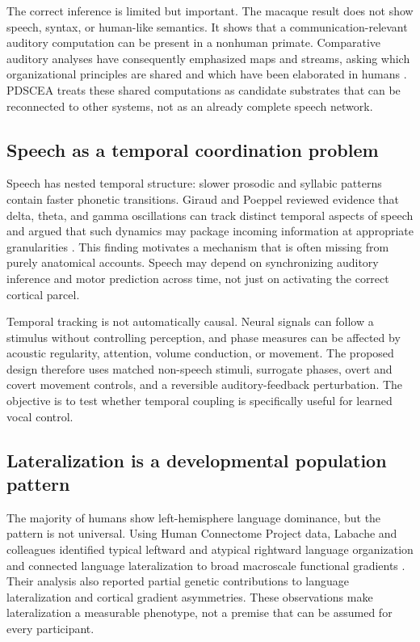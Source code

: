 \documentclass[conference]{IEEEtran}
\begin{document}
The correct inference is limited but important. The macaque result does not show speech, syntax, or human-like semantics. It shows that a communication-relevant auditory computation can be present in a nonhuman primate. Comparative auditory analyses have consequently emphasized maps and streams, asking which organizational principles are shared and which have been elaborated in humans \cite{rauschecker2009}. PDSCEA treats these shared computations as candidate substrates that can be reconnected to other systems, not as an already complete speech network.

\subsection{Speech as a temporal coordination problem}

Speech has nested temporal structure: slower prosodic and syllabic patterns contain faster phonetic transitions. Giraud and Poeppel reviewed evidence that delta, theta, and gamma oscillations can track distinct temporal aspects of speech and argued that such dynamics may package incoming information at appropriate granularities \cite{giraud2012}. This finding motivates a mechanism that is often missing from purely anatomical accounts. Speech may depend on synchronizing auditory inference and motor prediction across time, not just on activating the correct cortical parcel.

Temporal tracking is not automatically causal. Neural signals can follow a stimulus without controlling perception, and phase measures can be affected by acoustic regularity, attention, volume conduction, or movement. The proposed design therefore uses matched non-speech stimuli, surrogate phases, overt and covert movement controls, and a reversible auditory-feedback perturbation. The objective is to test whether temporal coupling is specifically useful for learned vocal control.

\subsection{Lateralization is a developmental population pattern}

The majority of humans show left-hemisphere language dominance, but the pattern is not universal. Using Human Connectome Project data, Labache and colleagues identified typical leftward and atypical rightward language organization and connected language lateralization to broad macroscale functional gradients \cite{labache2023}. Their analysis also reported partial genetic contributions to language lateralization and cortical gradient asymmetries. These observations make lateralization a measurable phenotype, not a premise that can be assumed for every participant.
\end{document}
